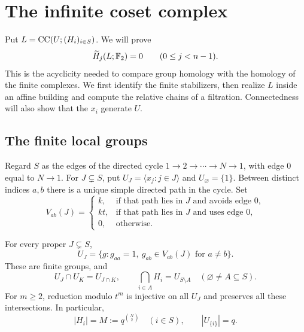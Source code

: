 \section{The infinite coset complex}
\label{sec:geometry}

Put $L=\operatorname{CC}(U;(H_i)_{i\in S})$. We will prove
\begin{equation}\label{eq:L-acyclic}
 \widetilde H_j(L;\mathbb F_2)=0\qquad(0\le j<n-1).
\end{equation}
This is the acyclicity needed to compare group homology with the homology
of the finite complexes. We first identify the finite stabilizers, then
realize $L$ inside an affine building and compute the relative chains of
a filtration. Connectedness will also show that the $x_i$ generate $U$.

\subsection{The finite local groups}

Regard $S$ as the edges of the directed cycle
$1\to2\to\cdots\to N\to1$, with edge $0$ equal to $N\to1$.
For $J\subsetneq S$, put $U_J=\langle x_j:j\in J\rangle$ and
$U_{\varnothing}=\{1\}$. Between distinct indices $a,b$ there is a unique
simple directed path in the cycle. Set
\[
 V_{ab}(J)=
 \begin{cases}
 k,&\text{if that path lies in $J$ and avoids edge $0$},\\
 kt,&\text{if that path lies in $J$ and uses edge $0$},\\
 0,&\text{otherwise}.
 \end{cases}
\]

\begin{lemma}\label{lem:patterns}
For every proper $J\subsetneq S$,
\begin{equation}\label{eq:pattern}
 U_J=\{g:g_{aa}=1,\ g_{ab}\in V_{ab}(J)\text{ for }a\ne b\}.
\end{equation}
These are finite groups, and
\begin{equation}\label{eq:intersections}
 U_J\cap U_K=U_{J\cap K},\qquad
 \bigcap_{i\in A}H_i=U_{S\setminus A}\quad(\varnothing\ne A\subseteq S).
\end{equation}
For $m\ge2$, reduction modulo $t^m$ is injective on all $U_J$ and preserves
all these intersections. In particular,
\begin{equation}\label{eq:M}
 |H_i|=M:=q^{\binom N2}\quad(i\in S),\qquad |U_{\{i\}}|=q.
\end{equation}
\end{lemma}

